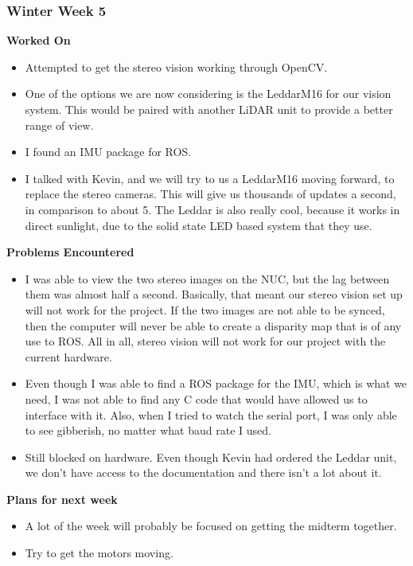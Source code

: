 \documentclass[compsoc,draftclsnofoot,onecolumn,10pt]{IEEEtran}
\begin{document}
\subsubsection*{Winter Week 5}
\textbf{Worked On}
\begin{itemize}
    \item Attempted to get the stereo vision working through OpenCV.
    \item One of the options we are now considering is the LeddarM16 for our vision system.
    This would be paired with another LiDAR unit to provide a better range of view.
    \item I found an IMU package for ROS.
    \item I talked with Kevin, and we will try to us a LeddarM16 moving forward, to replace the stereo cameras. This will give us thousands of updates a second, in comparison to about 5. The Leddar is also really cool, because it works in direct sunlight, due to the solid state LED based system that they use.
\end{itemize}
\textbf{Problems Encountered}
\begin{itemize}
    \item I was able to view the two stereo images on the NUC, but the lag between them was almost half a second.
    Basically, that meant our stereo vision set up will not work for the project. If the two images are not able to be synced, then the computer will never be able to create a disparity map that is of any use to ROS. All in all, stereo vision will not work for our project with the current hardware.
    \item Even though I was able to find a ROS package for the IMU, which is what we need, I was not able to find any C code that would have allowed us to interface with it. Also, when I tried to watch the serial port, I was only able to see gibberish, no matter what baud rate I used.
    \item Still blocked on hardware. Even though Kevin had ordered the Leddar unit, we don't have access to the documentation and there isn't a lot about it.
\end{itemize}
\textbf{Plans for next week}
\begin{itemize}
    \item A lot of the week will probably be focused on getting the midterm together.
    \item Try to get the motors moving.
\end{itemize}
\end{document}
